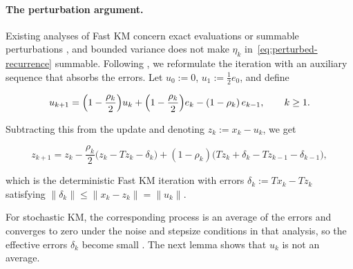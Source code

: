 \documentclass[10pt,draft]{article}
\numberwithin{equation}{section}
\theoremstyle{definition}
\theoremstyle{remark}
\begin{document}
\paragraph{}\label{rem:answer-q2}

\paragraph{The perturbation argument.} Existing analyses of Fast KM concern exact evaluations or summable perturbations \cite{yang2026ikm}, and bounded variance does not make $\eta_k$ in~\eqref{eq:perturbed-recurrence} summable. Following \cite[Section~2.1]{bravo2024stochastic}, we reformulate the iteration with an auxiliary sequence that absorbs the errors. Let $u_0:=0$, $u_1:=\frac12e_0$, and define

\begin{equation}\label{eq:aux-noise}
u_{k+1}=\Bigl(1-\frac{\rho_k}{2}\Bigr)u_k+\Bigl(1-\frac{\rho_k}{2}\Bigr)e_k-(1-\rho_k)\,e_{k-1},\qquad k\geq1.
\end{equation}

Subtracting this from the update and denoting $z_k:=x_k-u_k$, we get

\[
z_{k+1}=z_k-\frac{\rho_k}{2}\bigl(z_k-Tz_k-\delta_k\bigr)+(1-\rho_k)\bigl(Tz_k+\delta_k-Tz_{k-1}-\delta_{k-1}\bigr),
\]

which is the deterministic Fast KM iteration with errors $\delta_k:=Tx_k-Tz_k$ satisfying $\lVert\delta_k\rVert\leq\lVert x_k-z_k\rVert=\lVert u_k\rVert$.

For stochastic KM, the corresponding process is an average of the errors and converges to zero under the noise and stepsize conditions in that analysis, so the effective errors $\delta_k$ become small \cite[Section~2.1]{bravo2024stochastic}. The next lemma shows that $u_k$ is not an average.
\end{document}
